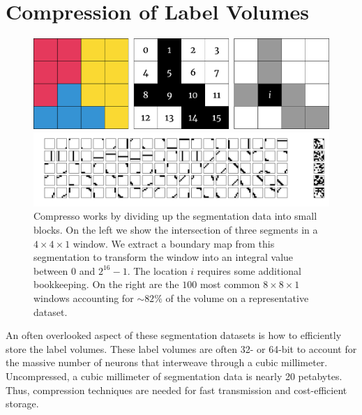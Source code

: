 \section{Compression of Label Volumes}

\begin{figure}[t]
	\begin{center}
		\begin{minipage}{0.45\linewidth}
			\centering
			\includegraphics[width=\linewidth]{./figures/encoding_diagram_opt.pdf}
		\end{minipage}
		\hspace{0.08\linewidth}
		\begin{minipage}{0.45\linewidth}
			\centering
			\includegraphics[width=\linewidth]{./figures/window_values.pdf}
		\end{minipage}
	\end{center}	
	\caption{Compresso works by dividing up the segmentation data into small blocks. On the left we show the intersection of three segments in a $4\times4\times1$ window. We extract a boundary map from this segmentation to transform the window into an integral value between $0$ and $2^{16} - 1$. The location $i$ requires some additional bookkeeping. On the right are the $100$ most common $8 \times 8 \times 1$ windows accounting for $\sim82\%$ of the volume on a representative dataset.}
	\label{fig:compression}
\end{figure}

An often overlooked aspect of these segmentation datasets is how to efficiently store the label volumes.
These label volumes are often 32- or 64-bit to account for the massive number of neurons that interweave through a cubic millimeter.
Uncompressed, a cubic millimeter of segmentation data is nearly 20 petabytes.
Thus, compression techniques are needed for fast transmission and cost-efficient storage.

